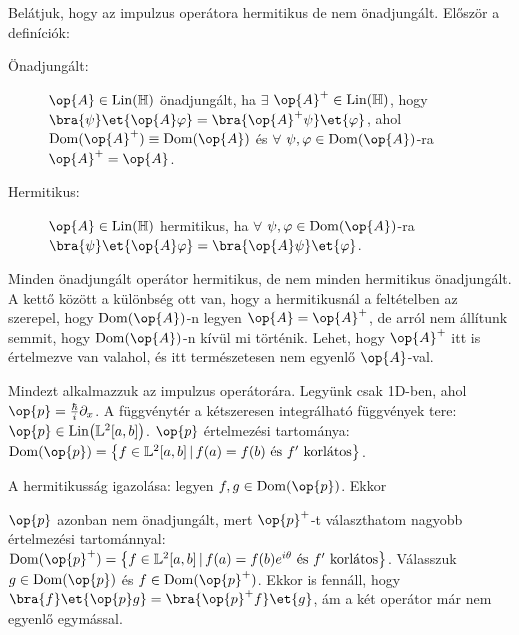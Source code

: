    Belátjuk, hogy az impulzus operátora hermitikus de nem önadjungált.
   Először a definíciók:
   \begin{description}
    \item[Önadjungált:] $\op{A}\in\mathrm{Lin}(\mathbb{H})$ önadjungált, ha $\exists$ $\op{A}^+\in\mathrm{Lin}(\mathbb{H})$, hogy  $\bra{\psi}\et{\op{A}\varphi}=\bra{\op{A}^+\psi}\et{\varphi}$, ahol $\mathrm{Dom}(\op{A}^+)\equiv\mathrm{Dom}(\op{A})$ és $\forall$ $\psi,\varphi\in\mathrm{Dom}(\op{A})$-ra $\op{A}^+=\op{A}$.
    \item[Hermitikus:] $\op{A}\in\mathrm{Lin}(\mathbb{H})$ hermitikus, ha $\forall$ $\psi,\varphi\in\mathrm{Dom}(\op{A})$-ra  $\bra{\psi}\et{\op{A}\varphi}=\bra{\op{A}\psi}\et{\varphi}$.
   \end{description}
   Minden önadjungált operátor hermitikus, de nem minden hermitikus önadjungált.
   A kettő között a különbség ott van, hogy a hermitikusnál a feltételben az szerepel, hogy $\mathrm{Dom}(\op{A})$-n legyen $\op{A}=\op{A}^+$, de arról nem állítunk semmit, hogy $\mathrm{Dom}(\op{A})$-n kívül mi történik.
   Lehet, hogy $\op{A}^+$ itt is értelmezve van valahol, és itt természetesen nem egyenlő $\op{A}$-val.
   
   Mindezt alkalmazzuk az impulzus operátorára.
   Legyünk csak 1D-ben, ahol $\op{p}=\frac{\hbar}{i}\partial_x$.
   A függvénytér a kétszeresen integrálható függvények tere: $\op{p}\in\mathrm{Lin}\big(\mathbb{L}^2[a,b]\big)$. $\op{p}$ értelmezési tartománya: $\mathrm{Dom}(\op{p})=\big\{f\in\mathbb{L}^2[a,b]\,|\,f(a)=f(b)\text{ és $f'$ korlátos}\big\}$. 
   
   A hermitikusság igazolása: legyen $f,g\in\mathrm{Dom}(\op{p})$.
   Ekkor
   
   $\op{p}$ azonban nem önadjungált, mert $\op{p}^+$-t választhatom nagyobb értelmezési tartománnyal: $\mathrm{Dom}(\op{p}^+)=\big\{f\in\mathbb{L}^2[a,b]\,|\,f(a)=f(b)e^{i\theta}\text{ és $f'$ korlátos}\big\}$.
   Válasszuk $g\in\mathrm{Dom}(\op{p})$ és $f\in\mathrm{Dom}(\op{p}^+)$.
   Ekkor is fennáll, hogy $\bra{f}\et{\op{p}g}=\bra{\op{p}^+f}\et{g}$, ám a két operátor már nem egyenlő egymással.
   
